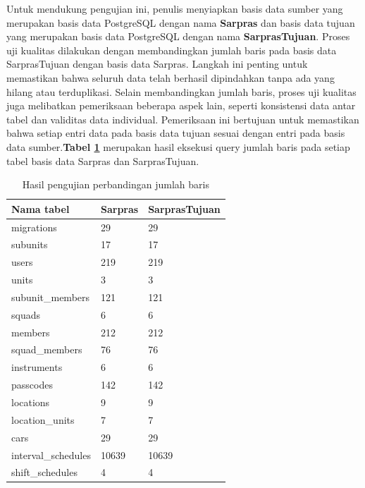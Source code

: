 Untuk mendukung pengujian ini, penulis menyiapkan basis data sumber yang merupakan basis data PostgreSQL dengan nama \textbf{Sarpras} dan basis data tujuan yang merupakan basis data PostgreSQL dengan nama \textbf{SarprasTujuan}. Proses uji kualitas dilakukan dengan membandingkan jumlah baris pada basis data SarprasTujuan dengan basis data Sarpras. Langkah ini penting untuk memastikan bahwa seluruh data telah berhasil dipindahkan tanpa ada yang hilang atau terduplikasi. Selain membandingkan jumlah baris, proses uji kualitas juga melibatkan pemeriksaan beberapa aspek lain, seperti konsistensi data antar tabel dan validitas data individual. Pemeriksaan ini bertujuan untuk memastikan bahwa setiap entri data pada basis data tujuan sesuai dengan entri pada basis data sumber.\textbf{Tabel \ref{tab:baris}} merupakan hasil eksekusi query jumlah baris pada setiap tabel basis data Sarpras dan SarprasTujuan.

\begin{table}
  \caption{Hasil pengujian perbandingan jumlah baris}
  \label{tab:baris}
  \centering
  \begin{tabular}{lll}
    \toprule
    \textbf{Nama tabel} & \textbf{Sarpras} & \textbf{SarprasTujuan} \\
    \midrule
    migrations & 29 & 29 \\
    
    subunits & 17 & 17 \\
    
    users & 219 & 219 \\
    
    units & 3 & 3 \\
    
    subunit\_members & 121 & 121 \\
    
    squads & 6 & 6 \\
    
    members & 212 & 212 \\
    
    squad\_members & 76 & 76 \\
    
    instruments & 6 & 6 \\
    
    passcodes & 142 & 142 \\
    
    locations & 9 & 9 \\
    
    location\_units & 7 & 7 \\
    
    cars & 29 & 29 \\
    
    interval\_schedules & 10639 & 10639 \\
    
    shift\_schedules & 4 & 4 \\
    \bottomrule
  \end{tabular}
  \end{table}

